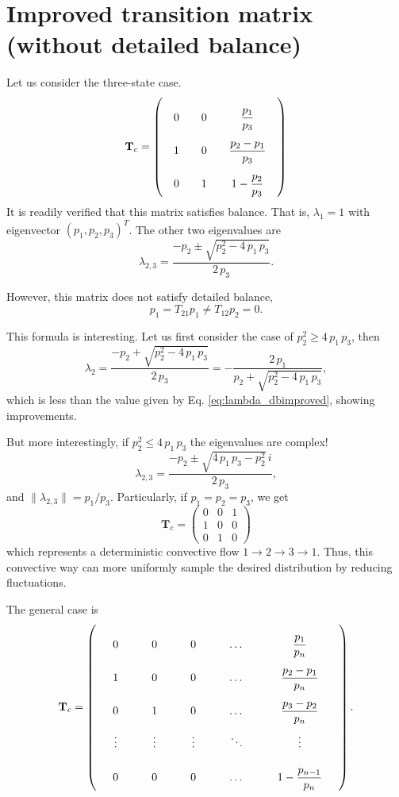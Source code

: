\documentclass[12pt]{article}
\begin{document}
\section{Improved transition matrix (without detailed balance)}


Let us consider the three-state case.
$$
\mathbf T_c
=
\left(
  \arraycolsep=10.0pt\def\arraystretch{2.5}
  \begin{array}{ccc}
    0     &   0   &   \dfrac{p_1}{p_3}   \\
    1     &   0   &   \dfrac{p_2 - p_1}{p_3} \\
    0     &   1   &   1 - \dfrac{p_2}{p_3}
  \end{array}
\right)
$$
It is readily verified that this matrix satisfies balance.
That is, $\lambda_1 = 1$ with eigenvector $(p_1, p_2, p_3)^T$.
The other two eigenvalues are
$$
\lambda_{2,3}
=
\frac{-p_2 \pm \sqrt{p_2^2 - 4 \, p_1 \, p_3} } { 2 \, p_3 }.
$$

However, this matrix does not satisfy detailed balance,
$$
p_1 = T_{21} p_1 \ne T_{12} p_2 = 0.
$$


This formula is interesting.
Let us first consider the case of $p_2^2 \ge 4 \, p_1 \, p_3$,
then
$$
\lambda_2 =
\frac{-p_2 + \sqrt{p_2^2 - 4 \, p_1 \, p_3} } { 2 \, p_3 }
=
-\frac{2 \, p_1 }{p_2 + \sqrt{p_2^2 - 4 \, p_1 \, p_3} },
$$
which is less than the value given by Eq. \eqref{eq:lambda_dbimproved},
showing improvements.

But more interestingly, if $p_2^2 \le 4 \, p_1 \, p_3$
the eigenvalues are complex!
$$
\lambda_{2,3}
=
\frac{-p_2 \pm \sqrt{4 \, p_1 \, p_3 - p_2^2} \, i } { 2 \, p_3 },
$$
and $\|\lambda_{2,3}\| = p_1/p_3$.
%
Particularly, if $p_1 = p_2 = p_3$, we get
$$
\mathbf T_c
=
\left(
  \begin{array}{ccc}
    0     &   0   &   1   \\
    1     &   0   &   0 \\
    0     &   1   &   0
  \end{array}
\right)
$$
which represents a deterministic convective flow
$1\rightarrow 2 \rightarrow 3 \rightarrow 1$.
Thus, this convective way can more uniformly
sample the desired distribution by reducing fluctuations.

The general case is
$$
\mathbf T_c
=
\left(
  \arraycolsep=15.0pt\def\arraystretch{2.5}
  \begin{array}{cccccc}
    0     &   0   &   0   &   \dots  &   \dfrac{p_1}{p_n}       \\
    1     &   0   &   0   &   \dots  &   \dfrac{p_2 - p_1}{p_n} \\
    0     &   1   &   0   &   \dots  &   \dfrac{p_3 - p_2}{p_n} \\
    \vdots&\vdots &\vdots &   \ddots &   \vdots \\
    0     &   0   &   0   &   \dots  &   1- \dfrac{p_{n-1}}{p_n} \\
  \end{array}
\right).
$$
\end{document}
